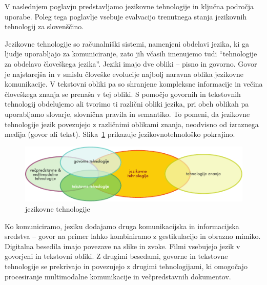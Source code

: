 \begin{multicols}{2}
V naslednjem poglavju predstavljamo jezikovne tehnologije in ključna področja uporabe. Poleg tega poglavlje vsebuje evalvacijo trenutnega stanja jezikovnih tehnologij za slovenščino.


\end{multicols}

\clearpage



\begin{multicols}{2}

Jezikovne tehnologije so računalniški sistemi, namenjeni obdelavi jezika, ki ga ljudje uporabljajo za komuniciranje, zato jih včasih imenujemo tudi “tehnologije za obdelavo človeškega jezika”. Jeziki imajo  dve obliki – pisno in govorno. Govor je najstarejša in v smislu človeške evolucije najbolj naravna oblika jezikovne komunikacije. V tekstovni obliki pa so shranjene kompleksne informacije in večina človeškega znanja se prenaša v tej obliki. S pomočjo govornih in tekstovnih tehnologij obdelujemo ali tvorimo ti različni obliki jezika, pri obeh oblikah pa uporabljamo slovarje, slovnična pravila in semantiko. To pomeni, da jezikovne tehnologije jezik povezujejo z različnimi oblikami znanja, neodvisno od izraznega medija (govor ali tekst). Slika~\ref{fig:ltincontext_de} prikazuje jezikovnotehnološko pokrajino. 

\begin{figure}[htb]
  \center
  \includegraphics[width=\textwidth]{../_media/slovene/language_technologies}
  \caption{jezikovne tehnologije}
  \label{fig:ltincontext_de}
\end{figure}

Ko komuniciramo, jeziku dodajamo druga komunikacijska in informacijska sredstva – govor na primer lahko kombiniramo z gestikulacijo in obrazno mimiko. Digitalna besedila imajo povezave na slike in zvoke. Filmi vsebujejo jezik v govorjeni in tekstovni obliki. Z drugimi besedami, govorne in tekstovne tehnologije se prekrivajo in povezujejo z drugimi tehnologijami, ki omogočajo procesiranje multimodalne komunikacije in večpredstavnih dokumentov.


\end{multicols}
